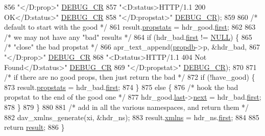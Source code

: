 \begin{DoxyCode}
856                     \textcolor{stringliteral}{"</D:prop>"} \hyperlink{group__MOD__DAV_ga5a242a2983fe78462523e34b6d6e3628}{DEBUG\_CR}
857                     \textcolor{stringliteral}{"<D:status>HTTP/1.1 200 OK</D:status>"} \hyperlink{group__MOD__DAV_ga5a242a2983fe78462523e34b6d6e3628}{DEBUG\_CR}
858                     \textcolor{stringliteral}{"</D:propstat>"} \hyperlink{group__MOD__DAV_ga5a242a2983fe78462523e34b6d6e3628}{DEBUG\_CR});
859 
860     \textcolor{comment}{/* default to start with the good */}
861     result.\hyperlink{structdav__get__props__result_a4b85233991b37cb03b36ef1bbf2a277f}{propstats} = hdr\_good.\hyperlink{structapr__text__header_a6db03d272f5e56058c84e10e49624c0b}{first};
862 
863     \textcolor{comment}{/* we may not have any "bad" results */}
864     \textcolor{keywordflow}{if} (hdr\_bad.\hyperlink{structapr__text__header_a6db03d272f5e56058c84e10e49624c0b}{first} != \hyperlink{pcre_8txt_ad7f989d16aa8ca809a36bc392c07fba1}{NULL}) \{
865         \textcolor{comment}{/* "close" the bad propstat */}
866         apr\_text\_append(\hyperlink{group__MOD__DAV_gac428117c2c7c0121d6e49a52085fd196}{propdb}->p, &hdr\_bad,
867                         \textcolor{stringliteral}{"</D:prop>"} \hyperlink{group__MOD__DAV_ga5a242a2983fe78462523e34b6d6e3628}{DEBUG\_CR}
868                         \textcolor{stringliteral}{"<D:status>HTTP/1.1 404 Not Found</D:status>"} \hyperlink{group__MOD__DAV_ga5a242a2983fe78462523e34b6d6e3628}{DEBUG\_CR}
869                         \textcolor{stringliteral}{"</D:propstat>"} \hyperlink{group__MOD__DAV_ga5a242a2983fe78462523e34b6d6e3628}{DEBUG\_CR});
870 
871         \textcolor{comment}{/* if there are no good props, then just return the bad */}
872         \textcolor{keywordflow}{if} (!have\_good) \{
873             result.\hyperlink{structdav__get__props__result_a4b85233991b37cb03b36ef1bbf2a277f}{propstats} = hdr\_bad.\hyperlink{structapr__text__header_a6db03d272f5e56058c84e10e49624c0b}{first};
874         \}
875         \textcolor{keywordflow}{else} \{
876             \textcolor{comment}{/* hook the bad propstat to the end of the good one */}
877             hdr\_good.\hyperlink{structapr__text__header_a3ebe57b46d323b8cefaba1e114acf09e}{last}->\hyperlink{structapr__text_aaf1b48e3f3085522fe7355e7d8893111}{next} = hdr\_bad.\hyperlink{structapr__text__header_a6db03d272f5e56058c84e10e49624c0b}{first};
878         \}
879     \}
880 
881     \textcolor{comment}{/* add in all the various namespaces, and return them */}
882     dav\_xmlns\_generate(xi, &hdr\_ns);
883     result.\hyperlink{structdav__get__props__result_a1f3c2a589a3a3d3169b8f6cf473fabc8}{xmlns} = hdr\_ns.\hyperlink{structapr__text__header_a6db03d272f5e56058c84e10e49624c0b}{first};
884 
885     \textcolor{keywordflow}{return} \hyperlink{group__APACHE__CORE__MPM_ga9f5959dd76d5c83e775dcf44de684686}{result};
886 \}
\end{DoxyCode}


